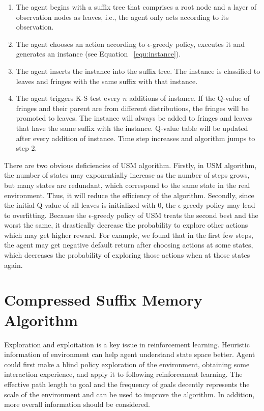 \documentclass[conference]{IEEEtran}
\begin{document}
	\begin{enumerate}
		\item The agent begins with a suffix tree that comprises a root node and a layer of
		observation nodes as leaves, i.e., the agent only acts according to its observation.
		
		\item The agent chooses an action according to $\epsilon$-greedy policy, executes it and
		generates an instance (see Equation ~\ref{equ:instance}).
		
		\item The agent inserts the instance into the suffix tree. The instance is classified to
		leaves and fringes with the same suffix with that instance. 
		
		\item The agent triggers K-S test every $n$ additions of instance. If the Q-value of fringes
		and their parent are from different distributions, the fringes will be promoted to leaves.
		The instance will always be added to fringes and leaves that have the same suffix with the instance.
		Q-value table will be updated after every addition of instance. Time step increases and algorithm
		jumps to step 2.
	\end{enumerate}
	
	There are two obvious deficiencies of USM algorithm. Firstly, in USM algorithm,
	the number of states may exponentially increase as the number of steps grows, but many
	states are redundant, which correspond to the same state in the real environment. Thus, it
	will reduce the efficiency of the algorithm. Secondly, since the initial Q value of all leaves
	is initialized with 0, the $\epsilon$-greedy policy may lead to overfitting. Because
	the $\epsilon$-greedy policy of USM treats the second best and the worst the same, it drastically
	decrease the probability to explore other actions which may get higher reward. For example,
	we found that in the first few steps, the agent may get negative default return after
	choosing actions at some states, which decreases the probability of exploring those actions
	when at those states again.
	
	\section{Compressed Suffix Memory Algorithm}
	
	Exploration and exploitation is a key issue in reinforcement learning. Heuristic information
	of environment can help agent understand state space better. Agent could first make a blind
	policy exploration of the environment, obtaining some interaction experience, and apply
	it to following reinforcement learning. The effective path length to goal and the frequency
	of goals decently represents the scale of the environment and can be used to improve the algorithm.
	In addition, more overall information should be considered.
	
\end{document}

